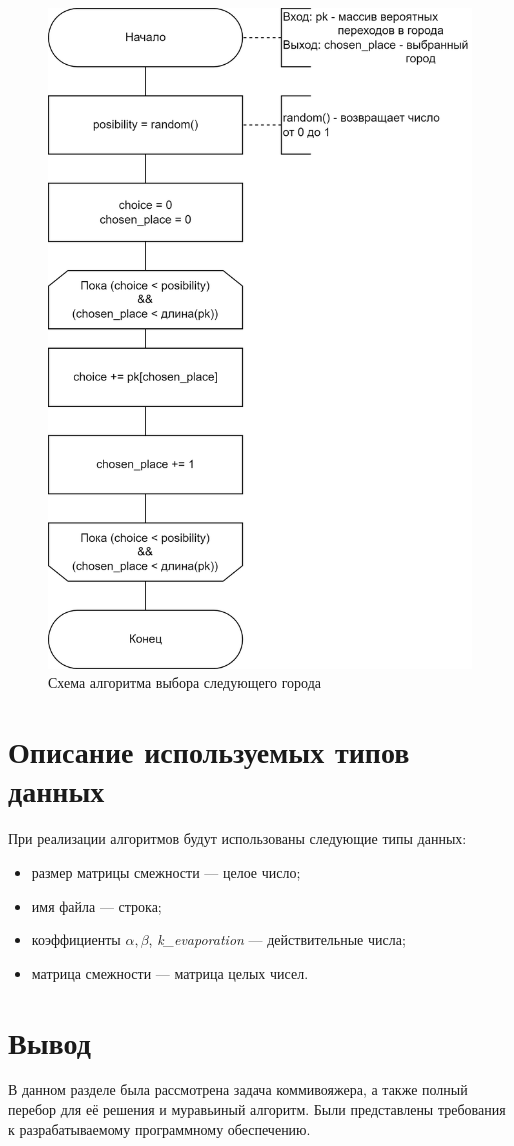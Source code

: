 \begin{figure}[h]
	\centering
	\includegraphics[height=0.7\textheight]{img/rand-choice.png}
	\caption{Схема алгоритма выбора следующего города}
	\label{fig:rand-choice}
\end{figure}

\clearpage

\section{Описание используемых типов данных}
При реализации алгоритмов будут использованы следующие типы данных:
\begin{itemize}[label=---]
	\item размер матрицы смежности --- целое число;
	\item имя файла --- строка;
	\item коэффициенты $\alpha, \beta$, \textit{k\_evaporation} --- действительные числа;
	\item матрица смежности --- матрица целых чисел.
\end{itemize}

\section*{Вывод}
В данном разделе была рассмотрена задача коммивояжера, а также полный перебор для её решения и муравьиный алгоритм. Были представлены требования к разрабатываемому программному обеспечению.
